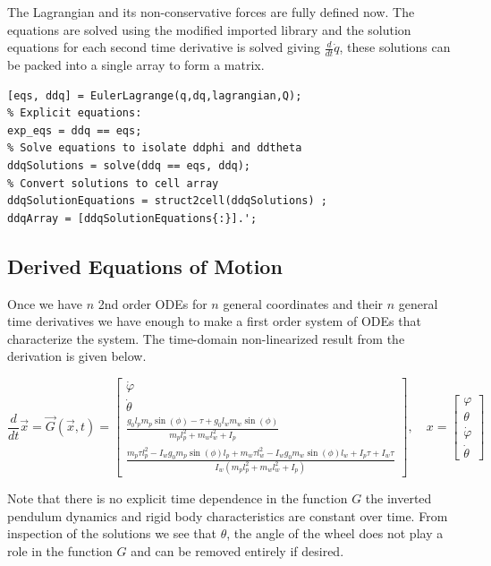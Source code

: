 \documentclass[11pt]{article}
\begin{document}
The Lagrangian and its non-conservative forces are fully defined now. The equations are solved using the modified imported library and the solution equations for each second time derivative is solved giving $\frac{d}{dt}\dot{q}$, these solutions can be packed into a single array to form a matrix. 

\begin{lstlisting}[caption={MATLAB Code}, label={lst:matlab_code}]
% Derive the equations of motion for each ddq
[eqs, ddq] = EulerLagrange(q,dq,lagrangian,Q);
% Explicit equations:
exp_eqs = ddq == eqs;
% Solve equations to isolate ddphi and ddtheta
ddqSolutions = solve(ddq == eqs, ddq);
% Convert solutions to cell array
ddqSolutionEquations = struct2cell(ddqSolutions) ;
ddqArray = [ddqSolutionEquations{:}].';
\end{lstlisting}

\subsection{Derived Equations of Motion}
Once we have $n$ 2nd order ODEs for $n$  general coordinates and their $n$ general time derivatives we have enough to make a first order system of ODEs that characterize the system.
The time-domain non-linearized result from the derivation is given below.

$$\frac{d}{dt}\vec{x} = \vec{G}(\vec{x}, t) = \begin{bmatrix}
\dot\varphi \\
\dot\theta \\
\frac{g_0 l_p m_p \sin(\phi) - \tau + g_0 l_w m_w \sin(\phi)}{m_p l_p^2 + m_w l_w^2 + I_p} \\
\frac{m_p \tau l_p^2 - I_w g_0 m_p \sin(\phi) l_p + m_w \tau l_w^2 - I_w g_0 m_w \sin(\phi) l_w + I_p \tau + I_w \tau}{I_w (m_p l_p^2 + m_w l_w^2 + I_p)}
\end{bmatrix}, \quad x = \begin{bmatrix}
\varphi \\ \theta \\ \dot{\varphi} \\ \dot{\theta}
\end{bmatrix}
$$

Note that there is no explicit time dependence in the function $G$ the inverted pendulum dynamics and rigid body characteristics are constant over time. From inspection of the solutions we see that $\theta$, the angle of the wheel does not play a role in the function $G$ and can be removed entirely if desired. 
\end{document}
